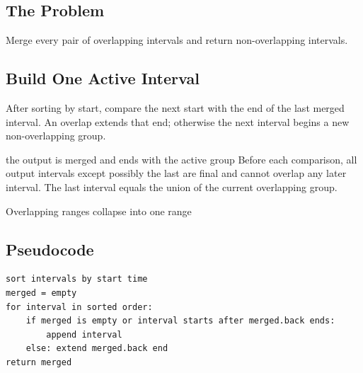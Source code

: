 
\subsection{The Problem}
Merge every pair of overlapping intervals and return non-overlapping intervals.

\subsection{Build One Active Interval}
After sorting by start, compare the next start with the end of the last merged
interval. An overlap extends that end; otherwise the next interval begins a
new non-overlapping group.

\begin{invariantbox}{the output is merged and ends with the active group}
Before each comparison, all output intervals except possibly the last are
final and cannot overlap any later interval. The last interval equals the union of the current
overlapping group.
\end{invariantbox}

\begin{visualbox}{Overlapping ranges collapse into one range}
\centering
{}
\end{visualbox}

\subsection{Pseudocode}
\begin{lstlisting}[style=pseudocode]
sort intervals by start time
merged = empty
for interval in sorted order:
    if merged is empty or interval starts after merged.back ends:
        append interval
    else: extend merged.back end
return merged
\end{lstlisting}

